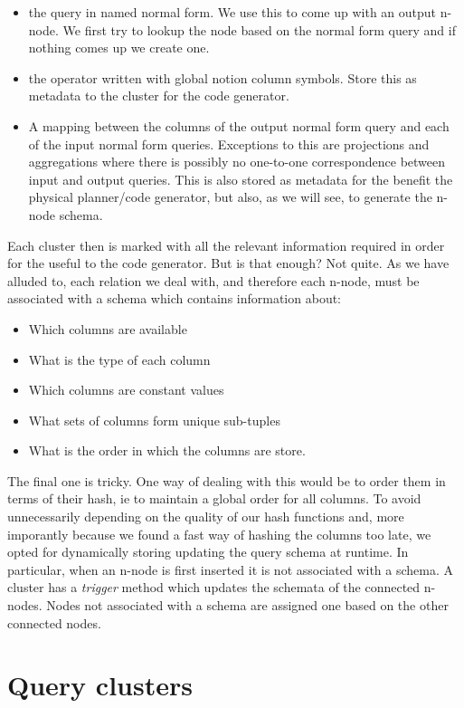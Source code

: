 \begin{itemize}
\item the query in named normal form. We use this to come up with an
  output n-node. We first try to lookup the node based on the
  normal form query and if nothing comes up we create one.
\item the operator written with global notion column symbols. Store
  this as metadata to the cluster for the code generator.
\item A mapping between the columns of the output normal form query and
  each of the input normal form queries. Exceptions to this are
  projections and aggregations where there is possibly no
  one-to-one correspondence between input and output queries. This
  is also stored as metadata for the benefit the physical
  planner/code generator, but also, as we will see, to generate the
  n-node schema.
\end{itemize}

Each cluster then is marked with all the relevant information
required in order for the useful to the code generator. But is that
enough? Not quite. As we have alluded to, each relation we deal
with, and therefore each n-node, must be associated with a schema
which contains information about:

\begin{itemize}
\item Which columns are available
\item What is the type of each column
\item Which columns are constant values
\item What sets of columns form unique sub-tuples
\item What is the order in which the columns are store.
\end{itemize}

The final one is tricky. One way of dealing with this would be to
order them in terms of their hash, ie to maintain a global order
for all columns. To avoid unnecessarily depending on the quality of
our hash functions and, more imporantly because we found a fast way
of hashing the columns too late, we opted for dynamically storing
updating the query schema at runtime. In particular, when an n-node
is first inserted it is not associated with a schema. A cluster has
a \emph{trigger} method which updates the schemata of the connected
n-nodes. Nodes not associated with a schema are assigned one based
on the other connected nodes.

\section{Query clusters}

